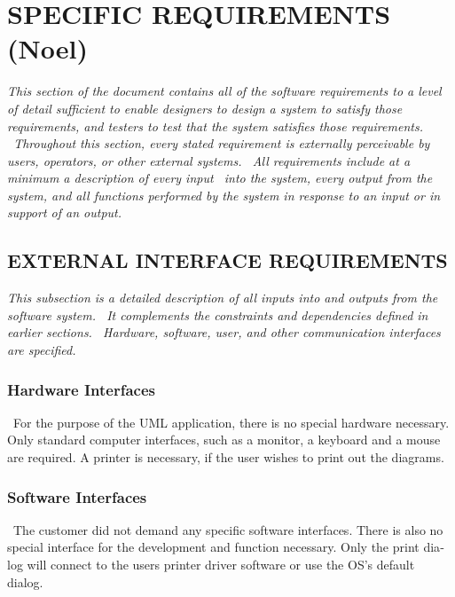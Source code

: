 \documentclass[twoside,letterpaper]{article}
\begin{document}
{%
\clearpage\section[SPECIFIC
REQUIREMENTS (Noel)]{\rmfamily\bfseries\color{black}
SPECIFIC REQUIREMENTS (Noel)}
{\itshape\color{black}
This section of the document contains all of the software
requirements to a level of detail sufficient to enable designers to
design a system to satisfy those requirements, and testers to test that
the system satisfies those requirements. \ Throughout this section,
every stated requirement is externally perceivable by users,
operators, or other external systems. \ All requirements include at a minimum a description of every input \ into the system, every output from the system, and all functions performed by the system
in response to an input or in support of an output.}

\subsection[EXTERNAL INTERFACE
REQUIREMENTS]{\rmfamily\bfseries\color{black}
EXTERNAL INTERFACE REQUIREMENTS}
{\itshape\color{black}
This subsection is a detailed description of all inputs into and
outputs from the software system. \ It complements the
constraints and dependencies defined in earlier sections. \ Hardware, software, user, and other
communication interfaces are specified.}

\subsubsection[Hardware
Interfaces]{\rmfamily\bfseries\color{black}
Hardware Interfaces}
{\color{black}
\foreignlanguage{english}{\ }\foreignlanguage{english}{For the purpose of the UML application, there is no special hardware necessary. Only standard computer interfaces, such as a monitor, a keyboard and a mouse are required. A printer is necessary, if the user wishes to print out the diagrams.}}

\subsubsection[Software
Interfaces]{\rmfamily\bfseries\color{black}
Software Interfaces}
{\color{black}
\foreignlanguage{english}{\ }\foreignlanguage{english}{The customer did not demand any specific software interfaces. There is also no special interface for the development and function necessary. Only the print dialog will connect to the users printer driver software or use the OS's default dialog.}}

}
\end{document}
